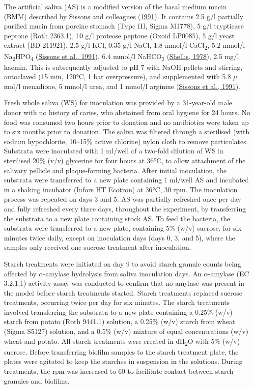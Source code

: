 \documentclass[
  letterpaper,
]{book}
\begin{document}
The artificial saliva (AS) is a modified version of the basal medium
mucin (BMM) described by Sissons and colleagues
(\protect\hyperlink{ref-sissonsMultistationPlaque1991}{1991}). It
contains 2.5 g/l partially purified mucin from porcine stomach (Type
III, Sigma M1778), 5 g/l trypticase peptone (Roth 2363.1), 10 g/l
proteose peptone (Oxoid LP0085), 5 g/l yeast extract (BD 211921), 2.5
g/l KCl, 0.35 g/l NaCl, 1.8 mmol/l CaCl\textsubscript{2}, 5.2 mmol/l
Na\textsubscript{2}HPO\textsubscript{4}
(\protect\hyperlink{ref-sissonsMultistationPlaque1991}{Sissons et al.,
1991}), 6.4 mmol/l NaHCO\textsubscript{3}
(\protect\hyperlink{ref-shellisSyntheticSaliva1978}{Shellis, 1978}), 2.5
mg/l haemin. This is subsequently adjusted to pH 7 with NaOH pellets and
stirring, autoclaved (15 min, 120°C, 1 bar overpressure), and
supplemented with 5.8 \(\mu\)mol/l menadione, 5 mmol/l urea, and 1
mmol/l arginine
(\protect\hyperlink{ref-sissonsMultistationPlaque1991}{Sissons et al.,
1991}).

Fresh whole saliva (WS) for inoculation was provided by a 31-year-old
male donor with no history of caries, who abstained from oral hygiene
for 24 hours. No food was consumed two hours prior to donation and no
antibiotics were taken up to six months prior to donation. The saliva
was filtered through a sterilised (with sodium hypochlorite, 10--15\%
active chlorine) nylon cloth to remove particulates. Substrata were
inoculated with 1 ml/well of a two-fold dilution of WS in sterilised
20\% (v/v) glycerine for four hours at 36°C, to allow attachment of the
salivary pellicle and plaque-forming bacteria. After initial
inoculation, the substrata were transferred to a new plate containing 1
ml/well AS and incubated in a shaking incubator (Infors HT Ecotron) at
36°C, 30 rpm. The inoculation process was repeated on days 3 and 5. AS
was partially refreshed once per day and fully refreshed every three
days, throughout the experiment, by transferring the substrata to a new
plate containing stock AS. To feed the bacteria, the substrata were
transferred to a new plate, containing 5\% (w/v) sucrose, for six
minutes twice daily, except on inoculation days (days 0, 3, and 5),
where the samples only received one sucrose treatment after inoculation.

Starch treatments were initiated on day 9 to avoid starch granule counts
being affected by \(\alpha\)-amylase hydrolysis from saliva inoculation
days. An \(\alpha\)-amylase (EC 3.2.1.1) activity assay was conducted to
confirm that no amylase was present in the model before starch
treatments started. Starch treatments replaced sucrose treatments,
occurring twice per day for six minutes. The starch treatments involved
transferring the substrata to a new plate containing a 0.25\% (w/v)
starch from potato (Roth 9441.1) solution, a 0.25\% (w/v) starch from
wheat (Sigma S5127) solution, and a 0.5\% (w/v) mixture of equal
concentrations (w/v) wheat and potato. All starch treatments were
created in dH\textsubscript{2}O with 5\% (w/v) sucrose. Before
transferring biofilm samples to the starch treatment plate, the plates
were agitated to keep the starches in suspension in the solutions.
During treatments, the rpm was increased to 60 to facilitate contact
between starch granules and biofilms.
\end{document}
